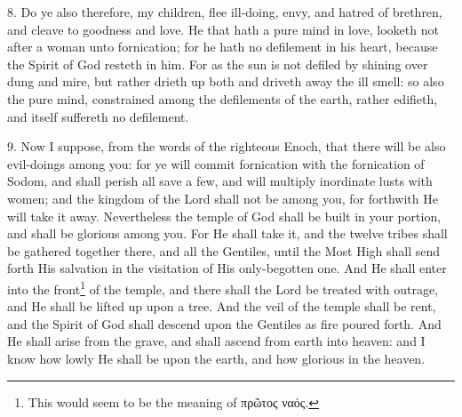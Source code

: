8. Do ye also therefore, my children, flee ill-doing, envy, and hatred of brethren, and cleave to goodness and love. He that hath a pure mind in love, looketh not after a woman unto fornication; for he hath no defilement in his heart, because the Spirit of God resteth in him. For as the sun is not defiled by shining over dung and mire, but rather drieth up both and driveth away the ill smell: so also the pure mind, constrained among the defilements of the earth, rather edifieth, and itself suffereth no defilement.

9. Now I suppose, from the words of the righteous Enoch, that there will be also evil-doings among you: for ye will commit fornication with the fornication of Sodom, and shall perish all save a few, and will multiply inordinate lusts with women; and the kingdom of the Lord shall not be among you, for forthwith He will take it away. Nevertheless the temple of God shall be built in your portion, and shall be glorious among you. For He shall take it, and the twelve tribes shall be gathered together there, and all the Gentiles, until the Most High shall send forth His salvation in the visitation of His only-begotten one. And He shall enter into the front\footnote{This would seem to be the meaning of \textgreek{πρῶτος ναός}.} of the temple, and there shall the Lord be treated with outrage, and He shall be lifted up upon a tree. And the veil of the temple shall be rent, and the Spirit of God shall descend upon the Gentiles as fire poured forth. And He shall arise from the grave, and shall ascend from earth into heaven: and I know how lowly He shall be upon the earth, and how glorious in the heaven.

